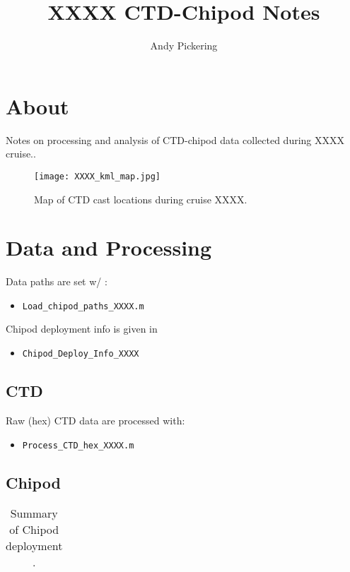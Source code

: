 \documentclass[11pt]{article}
\title{XXXX CTD-Chipod Notes}
\author{Andy Pickering}
\begin{document}
\maketitle

\tableofcontents
\newpage

\section{About}

Notes on processing and analysis of CTD-chipod data collected during XXXX cruise..

\begin{figure}[htbp]
\texttt{[image: XXXX\_kml\_map.jpg]}
\caption{Map of CTD cast locations during cruise XXXX.}
\label{map}
\end{figure}


\section{Data and Processing}

Data paths are set w/ : 
\begin{itemize}
\item \verb+Load_chipod_paths_XXXX.m+
\end{itemize}

Chipod deployment info is given in 
\begin{itemize}
\item \verb+Chipod_Deploy_Info_XXXX+
\end{itemize}


\subsection{CTD}

Raw (hex) CTD data are processed with:
\begin{itemize}
\item \verb+Process_CTD_hex_XXXX.m+
\end{itemize}

\subsection{Chipod}

\begin{table}[htdp]
\caption{Summary of Chipod deployment .}
\begin{center}
\begin{tabular}{|c|c|c|c|}
\hline
\end{tabular}
\end{center}
\label{default}
\end{table}%
\end{document}
